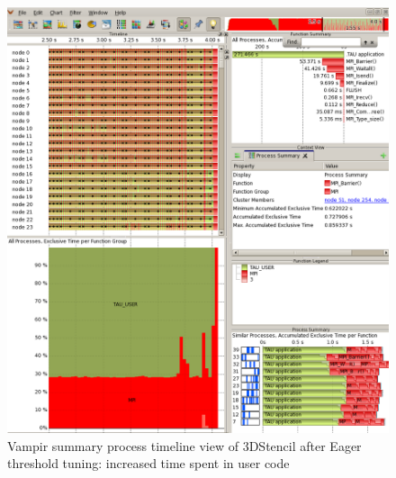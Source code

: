  \begin{figure}[tbp!]
  \centering
  \captionsetup{justification=centering}
  \includegraphics[scale=1.0,width=\columnwidth,keepaspectratio]{figures/Overlap-after}
         \caption{Vampir summary process timeline view of 3DStencil after Eager threshold tuning: increased time spent in user code}
 \label{fig:aftereager}
 \end{figure}


